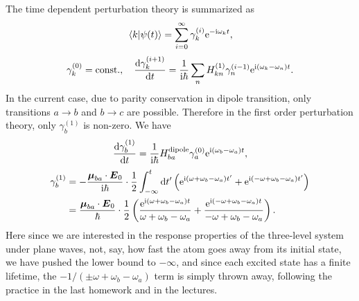 \documentclass[hyperref, a4paper]{article}
\newcommand*{\ii}{\mathrm{i}}
\newcommand*{\ee}{\mathrm{e}}
\newcommand*{\const}{\mathrm{const}}
\begin{document}
The time dependent perturbation theory is summarized as 
\begin{equation}
    \braket*{k}{{\psi(t)}} = 
    \sum_{i=0}^\infty \gamma_k^{(i)} \ee^{- \ii \omega_k t},  
\end{equation}
\begin{equation}
    \gamma^{(0)}_k = \const., \quad 
    \dv{\gamma^{(i+1)}_k}{t} = \frac{1}{\ii \hbar} \sum_n 
        H_{kn}^{(1)} \gamma_n^{(i-1)} \ee^{\ii (\omega_k - \omega_n) t}.
\end{equation}
In the current case, due to parity conservation in dipole transition, 
only transitions $a \to b$ and $b \to c$ are possible.
Therefore in the first order perturbation theory, 
only $\gamma_b^{(1)}$ is non-zero.
We have 
\begin{equation}
    \dv{\gamma_b^{(1)}}{t} = \frac{1}{\ii\hbar} H^{\text{dipole}}_{ba} \gamma_a^{(0)} \ee^{\ii (\omega_b - \omega_a) t},
\end{equation}
\begin{equation}
    \begin{aligned}
        \gamma_b^{(1)} &= - \frac{\vb*{\mu}_{ba} \cdot \vb*{E}_0}{\ii\hbar} 
        \cdot \frac{1}{2} \int_{-\infty}^{t} \dd{t'} \left(
            \ee^{\ii (\omega + \omega_b - \omega_a) t'}
            + \ee^{\ii (- \omega + \omega_b - \omega_a) t'}
        \right) \\
        &= \frac{\vb*{\mu}_{ba} \cdot \vb*{E}_0}{\hbar} \cdot 
        \frac{1}{2} \left(
            \frac{
                \ee^{\ii (\omega + \omega_b - \omega_a) t} 
            }{
                \omega + \omega_b - \omega_a
            } +
            \frac{
                \ee^{\ii (- \omega + \omega_b - \omega_a) t} 
            }{
                - \omega + \omega_b - \omega_a
            } 
        \right).
    \end{aligned}
\end{equation}
Here since we are interested in the 
response properties of the three-level system
under plane waves, 
not, say, how fast the atom goes away from its initial state, 
we have pushed the lower bound to $-\infty$, 
and since each excited state has a finite lifetime, 
the $- 1 / (\pm \omega + \omega_b - \omega_a)$ term is simply thrown away,
following the practice in the last homework 
and in the lectures.
\end{document}
